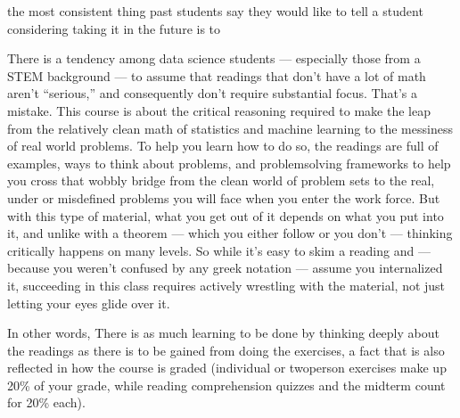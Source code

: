 \documentclass[letterpaper,10pt,english]{jupyterBook}
\begin{document}
\sphinxAtStartPar
{} the most consistent thing past students say they would like to tell a student considering taking it in the future is to 

\sphinxAtStartPar
There is a tendency among data science students — especially those from a STEM background — to assume that readings that don’t have a lot of math aren’t “serious,” and consequently don’t require substantial focus. That’s a mistake. This course is about the critical reasoning required to make the leap from the relatively clean math of statistics and machine learning to the messiness of real world problems. To help you learn how to do so, the readings are full of examples, ways to think about problems, and problem\sphinxhyphen{}solving frameworks to help you cross that wobbly bridge from the clean world of problem sets to the real, under\sphinxhyphen{} or mis\sphinxhyphen{}defined problems you will face when you enter the work force. But with this type of material, what you get out of it depends on what you put into it, and unlike with a theorem — which you either follow or you don’t — thinking critically happens on many levels. So while it’s easy to skim a reading and — because you weren’t confused by any greek notation — assume you internalized it, succeeding in this class requires actively wrestling with the material, not just letting your eyes glide over it.

\sphinxAtStartPar
In other words,  There is as much learning to be done by thinking deeply about the readings as there is to be gained from doing the exercises, a fact that is also reflected in how the course is graded (individual or two\sphinxhyphen{}person exercises make up 20\% of your grade, while reading comprehension quizzes and the midterm count for 20\% each).

\begin{DUlineblock}{0em}
\item[] 
\end{DUlineblock}
\end{document}
